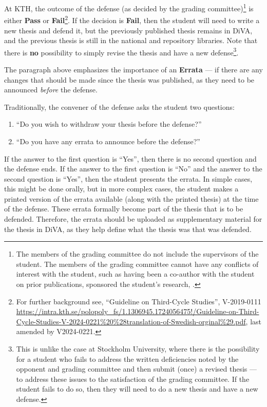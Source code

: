 \documentclass[12pt, twoside]{article}
\begin{document}
At \gls{KTH}, the outcome of the defense (as decided by the grading committee)\footnote{The members of the grading committee do not include the supervisors of the student. The members of the grading committee cannot have any conflicts of interest with the student, such as having been a co-author with the student on prior publications, sponsored the student's research, \etc.} is either \textbf{Pass} or \textbf{Fail}\footnote{For further background see, \enquote{Guideline on Third-Cycle Studies}, V-2019-0111 \url{https://intra.kth.se/polopoly_fs/1.1306945.1724056475!/Guideline-on-Third-Cycle-Studies-V-2024-0221\%20\%28translation-of-Swedish-orginal\%29.pdf}, last amended by V2024-0221.}. If the decision is \textbf{Fail}, then the student will need to write a new thesis and defend it, but the previously published thesis remains in \gls{DiVA}, and the previous thesis is still in the national and repository libraries. Note that there is \textbf{no} possibility to simply revise the thesis and have a new defense\footnote{This is unlike the case at Stockholm University, where there is the possibility for a student who fails to address the written deficiencies noted by the opponent and grading committee and then submit (once) a revised thesis --- to address these issues to the satisfaction of the grading committee. If the student fails to do so, then they will need to do a new thesis and have a new defense.}.

The paragraph above emphasizes the importance of an \textbf{Errata} --- if there are any changes that should be made since the thesis was published, as they need to be announced \textit{before} the defense. 

Traditionally, the convener of the defense asks the student two questions:
\begin{enumerate}
    \item \enquote{Do you wish to withdraw your thesis before the defense?}

    \item \enquote{Do you have any errata to announce before the defense?}
\end{enumerate}

If the answer to the first question is \enquote{Yes}, then there is no second question and the defense ends.
If the answer to the first question is \enquote{No} and the answer to the second question is \enquote{Yes}, then the student presents the errata. In simple cases, this might be done orally, but in more complex cases, the student makes a printed version of the errata available (along with the printed thesis) at the time of the defense. These errata formally become part of the thesis that is to be defended. Therefore, the errata should be uploaded as supplementary material for the thesis in \gls{DiVA}, as they help define what the thesis was that was defended.
\end{document}
